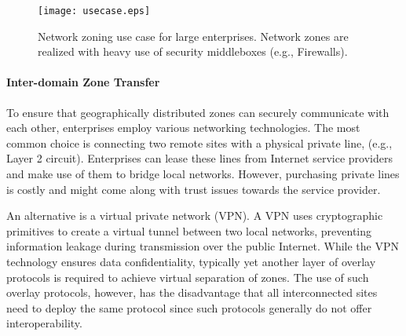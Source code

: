 \begin{figure}[t]
\begin{center}
\texttt{[image: usecase.eps]}
\end{center}
\caption{Network zoning use case for large enterprises. Network zones are 
realized with heavy use of security middleboxes (e.g., Firewalls).}
\label{fig:usecase}
\end{figure}

\paragraph{Inter-domain Zone Transfer}
To ensure that geographically distributed zones can securely communicate with each other, 
enterprises employ various networking technologies. The most common choice is connecting
two remote sites with a physical private line, (e.g., Layer 2 circuit). %
Enterprises 
can lease these lines from Internet service providers and make use of them to bridge local 
networks. However, purchasing private lines is costly and might come along 
with trust issues towards the service provider. 

An alternative is a virtual private 
network (VPN). A VPN uses cryptographic primitives to create a virtual tunnel between two 
local networks, preventing information leakage during transmission over the public Internet. 
While the VPN technology ensures data confidentiality, typically yet another layer of overlay 
protocols is required to achieve virtual separation of zones. The use of such overlay 
protocols, however, has the disadvantage that all interconnected sites need to deploy the same 
protocol since such protocols generally do not offer interoperability.



